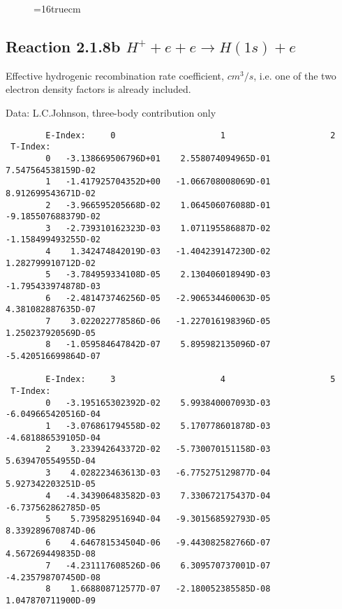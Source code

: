 \documentclass[12pt,dvipdfmx]{article}
\begin{document}
\begin{figure} \label{2.1.8a}
\epsfxsize=16truecm
\end{figure}
\newpage

\subsection{
  Reaction 2.1.8b  $H^+ + e + e \rightarrow H(1s) + e$
}

   Effective hydrogenic recombination rate coefficient, $cm^3/s$,
   i.e. one of the two electron density factors is already included.

   Data: L.C.Johnson, three-body contribution only



\begin{small}\begin{verbatim}
        E-Index:     0                     1                     2
 T-Index:
        0   -3.138669506796D+01    2.558074094965D-01    7.547564538159D-02
        1   -1.417925704352D+00   -1.066708008069D-01    8.912699543671D-02
        2   -3.966595205668D-02    1.064506076088D-01   -9.185507688379D-02
        3   -2.739310162323D-03    1.071195586887D-02   -1.158499493255D-02
        4    1.342474842019D-03   -1.404239147230D-02    1.282799910712D-02
        5   -3.784959334108D-05    2.130406018949D-03   -1.795433974878D-03
        6   -2.481473746256D-05   -2.906534460063D-05    4.381082887635D-07
        7    3.022022778586D-06   -1.227016198396D-05    1.250237920569D-05
        8   -1.059584647842D-07    5.895982135096D-07   -5.420516699864D-07

        E-Index:     3                     4                     5
 T-Index:
        0   -3.195165302392D-02    5.993840007093D-03   -6.049665420516D-04
        1   -3.076861794558D-02    5.170778601878D-03   -4.681886539105D-04
        2    3.233942643372D-02   -5.730070151158D-03    5.639470554955D-04
        3    4.028223463613D-03   -6.775275129877D-04    5.927342203251D-05
        4   -4.343906483582D-03    7.330672175437D-04   -6.737562862785D-05
        5    5.739582951694D-04   -9.301568592793D-05    8.339289670874D-06
        6    4.646781534504D-06   -9.443082582766D-07    4.567269449835D-08
        7   -4.231117608526D-06    6.309570737001D-07   -4.235798707450D-08
        8    1.668808712577D-07   -2.180052385585D-08    1.047870711900D-09


\end{verbatim}
\end{small}
\end{document}
